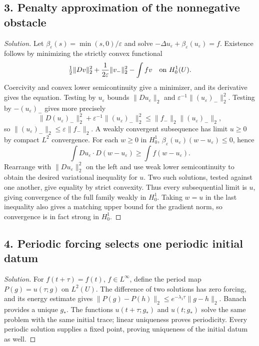 \subsection*{3. Penalty approximation of the nonnegative obstacle}
\begin{proof}[Solution]
Let $\beta_\varepsilon(s)=\min(s,0)/\varepsilon$ and solve
$-\Delta u_\varepsilon+\beta_\varepsilon(u_\varepsilon)=f$.
Existence follows by minimizing the strictly convex functional
\[
 \tfrac12\|Dv\|_2^2+{1\over2\varepsilon}\|v_-\|_2^2-\int fv
 \quad\hbox{on }H^1_0(U).
\]
Coercivity and convex lower semicontinuity give a minimizer, and
its derivative gives the equation. Testing by $u_\varepsilon$ bounds
$\|Du_\varepsilon\|_2$ and $\varepsilon^{-1}\|(u_\varepsilon)_-\|_2^2$.
Testing by $-(u_\varepsilon)_-$ gives more precisely
\[
 \|D(u_\varepsilon)_-\|_2^2+
 \varepsilon^{-1}\|(u_\varepsilon)_-\|_2^2
 \leq\|f_-\|_2\|(u_\varepsilon)_-\|_2,
\]
so $\|(u_\varepsilon)_-\|_2\leq\varepsilon\|f_-\|_2$.
A weakly convergent subsequence has limit $u\geq0$ by compact $L^2$
convergence. For each $w\geq0$ in $H^1_0$,
$\beta_\varepsilon(u_\varepsilon)(w-u_\varepsilon)\leq0$, hence
\[
 \int Du_\varepsilon\cdot D(w-u_\varepsilon)
 \geq\int f(w-u_\varepsilon).
\]
Rearrange with $\|Du_\varepsilon\|_2^2$ on the left and use weak
lower semicontinuity to obtain the desired variational inequality for $u$.
Two such solutions, tested against one another, give equality by strict
convexity. Thus every subsequential limit is $u$, giving convergence
of the full family weakly in $H^1_0$. Taking $w=u$ in the last inequality
also gives a matching upper bound for the gradient norm, so convergence
is in fact strong in $H^1_0$.
\end{proof}

\subsection*{4. Periodic forcing selects one periodic initial datum}
\begin{proof}[Solution]
For $f(t+\tau)=f(t)$, $f\in L^\infty$, define the period map
$P(g)=u(\tau;g)$ on $L^2(U)$. The difference of two solutions has zero
forcing, and its energy estimate gives
$\|P(g)-P(h)\|_2\leq e^{-\lambda_1\tau}\|g-h\|_2$.
Banach provides a unique $g_*$. The functions $u(t+\tau;g_*)$ and
$u(t;g_*)$ solve the same problem with the same initial trace; linear
uniqueness proves periodicity. Every periodic solution supplies a fixed
point, proving uniqueness of the initial datum as well.
\end{proof}

